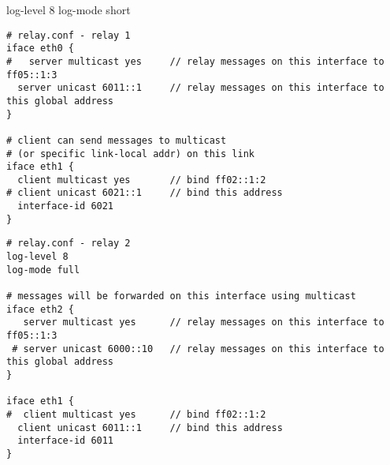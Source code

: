 log-level 8
log-mode short

\begin{verbatim}
# relay.conf - relay 1
iface eth0 {
#   server multicast yes     // relay messages on this interface to ff05::1:3
  server unicast 6011::1     // relay messages on this interface to this global address
}

# client can send messages to multicast 
# (or specific link-local addr) on this link
iface eth1 {
  client multicast yes       // bind ff02::1:2
# client unicast 6021::1     // bind this address
  interface-id 6021
}
\end{verbatim}

\begin{verbatim}
# relay.conf - relay 2
log-level 8
log-mode full

# messages will be forwarded on this interface using multicast
iface eth2 {
   server multicast yes      // relay messages on this interface to ff05::1:3
 # server unicast 6000::10   // relay messages on this interface to this global address
}

iface eth1 {
#  client multicast yes      // bind ff02::1:2
  client unicast 6011::1     // bind this address
  interface-id 6011
}
\end{verbatim}



